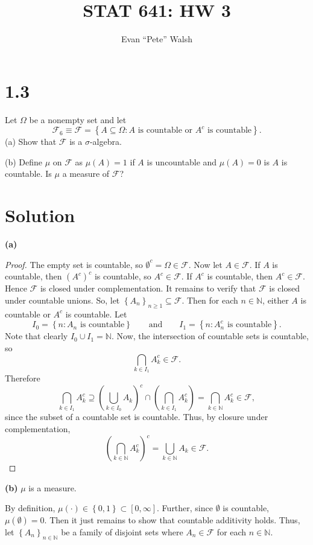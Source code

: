 \documentclass[12pt]{article}
\title{STAT 641: HW 3}
\author{Evan ``Pete'' Walsh}
\begin{document}
\maketitle

\section*{1.3}
Let $\Omega$ be a nonempty set and let 
\[ \mathcal{F}_{6} \equiv \mathcal{F}  = \left\{ A \subseteq \Omega : A\text{ is countable or }A^{c}\text{ is countable} \right\}. \]
(a) Show that $\mathcal{F}$ is a $\sigma$-algebra.

(b) Define $\mu$ on $\mathcal{F}$ as $\mu(A) = 1$ if $A$ is uncountable and $\mu(A) = 0$ is $A$ is countable. Is $\mu$ a measure of $\mathcal{F}$?

\section*{Solution}

{\bf (a)}
\begin{proof}
The empty set is countable, so $\emptyset^{c} = \Omega \in \mathcal{F}$. Now let $A \in \mathcal{F}$. If $A$ is countable, then $(A^{c})^{c}$ is
countable, so $A^{c} \in \mathcal{F}$. If $A^{c}$ is countable, then $A^{c} \in \mathcal{F}$. Hence $\mathcal{F}$ is closed under complementation. It
remains to verify that $\mathcal{F}$ is closed under countable unions. So, let $\left\{ A_{n} \right\}_{n\geq 1} \subseteq \mathcal{F}$. Then for each $n \in
\mathbb{N}$, either $A$ is countable or $A^{c}$ is countable. Let 
\[ I_{0} = \left\{ n : A_{n} \text{ is countable} \right\} \qquad \text{and} \qquad I_{1} = \left\{ n : A_{n}^{c}\text{ is countable} \right\}. \]
Note that clearly $I_{0} \cup I_{1} = \mathbb{N}$. Now, the intersection of countable sets is countable, so 
\[ \bigcap_{k \in I_{1}}A_{k}^{c} \in \mathcal{F}. \]
Therefore 
\[ \bigcap_{k \in I_{1}}A_{k}^{c} \supseteq \left( \bigcup_{k \in I_{0}}A_{k} \right)^{c} \cap \left( \bigcap_{k\in I_{1}}A_{k}^{c} \right) =
\bigcap_{k \in \mathbb{N}}A_{k}^{c} \in \mathcal{F}, \]
since the subset of a countable set is countable. Thus, by closure under complementation, 
\[ \left( \bigcap_{k\in\mathbb{N}}A_{k}^{c} \right)^{c} = \bigcup_{k\in\mathbb{N}}A_{k} \in \mathcal{F}. \]
\end{proof}

{\bf (b)} $\mu$ is a measure.

By definition, $\mu(\cdot) \in \left\{ 0, 1 \right\} \subset [0, \infty]$. Further, since $\emptyset$ is countable, $\mu(\emptyset) = 0$. Then it just
remains to show that countable additivity holds. Thus, let $\left\{ A_{n} \right\}_{n\in\mathbb{N}}$ be a family of disjoint sets where $A_{n} \in
\mathcal{F}$ for each $n \in \mathbb{N}$.
\end{document}
